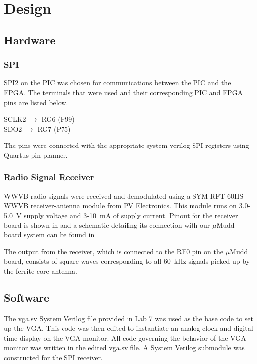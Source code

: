 \documentclass[11pt]{article}
\begin{document}
\section{Design}

\subsection {Hardware}

\subsubsection {SPI}
SPI2 on the PIC was chosen for communications between the PIC and the FPGA. The terminals that were used and their corresponding PIC and FPGA pins are listed below.

\begin{center}
SCLK2 $\rightarrow$  RG6 (P99)\\
SDO2 $\rightarrow$ RG7 (P75)
\end{center}

The pins were connected with the appropriate system verilog SPI registers using Quartus pin planner.

\subsubsection {Radio Signal Receiver}
WWVB radio signals were received and demodulated using a SYM-RFT-60HS WWVB receiver-antenna module from PV Electronics.\cite{receiverdatasheet} This module runs on 3.0- \SI{5.0}{\volt} supply voltage and 3-\SI{10}{\milli \ampere} of supply current. Pinout for the receiver board is shown in %
and a schematic detailing its connection with our $\mu$Mudd board system can be found in %

	The output from the receiver, which is connected to the RF0 pin on the $\mu$Mudd board, consists of square waves corresponding to all \SI{60}{\kilo \hertz} signals picked up by the ferrite core antenna. 
    
\subsection {Software}
The vga.sv System Verilog file provided in Lab 7 was used as the base code to set up the VGA. This code was then edited to instantiate an analog clock and digital time display on the VGA monitor. All code governing the behavior of the VGA monitor was written in the edited vga.sv file. A System Verilog submodule was constructed for the SPI receiver.
\end{document}
